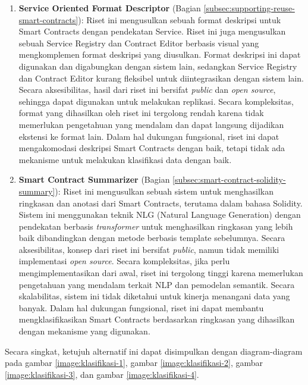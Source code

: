\begin{enumerate}
    \item \textbf{Service Oriented Format Descriptor} \parencite{guida2019supporting} (Bagian \ref{subsec:supporting-reuse-smart-contracts}): Riset ini mengusulkan sebuah format deskripsi untuk Smart Contracts dengan pendekatan Service. Riset ini juga mengusulkan sebuah Service Registry dan Contract Editor berbasis visual yang mengkomplemen format deskripsi yang diusulkan. Format deskripsi ini dapat digunakan dan digabungkan dengan sistem lain, sedangkan Service Registry dan Contract Editor kurang fleksibel untuk diintegrasikan dengan sistem lain. Secara aksesibilitas, hasil dari riset ini bersifat \textit{public} dan \textit{open source}, sehingga dapat digunakan untuk melakukan replikasi. Secara kompleksitas, format yang dihasilkan oleh riset ini tergolong rendah karena tidak memerlukan pengetahuan yang mendalam dan dapat langsung dijadikan ekstensi ke format lain. Dalam hal dukungan fungsional, riset ini dapat mengakomodasi deskripsi Smart Contracts dengan baik, tetapi tidak ada mekanisme untuk melakukan klasifikasi data dengan baik.
    
    \item \textbf{Smart Contract Summarizer} \parencite{zhang2021smart} (Bagian \ref{subsec:smart-contract-solidity-summary}): Riset ini mengusulkan sebuah sistem untuk menghasilkan ringkasan dan anotasi dari Smart Contracts, terutama dalam bahasa Solidity. Sistem ini menggunakan teknik NLG (Natural Language Generation) dengan pendekatan berbasis \textit{transformer} untuk menghasilkan ringkasan yang lebih baik dibandingkan dengan metode berbasis template sebelumnya. Secara aksesibilitas, konsep dari riset ini bersifat \textit{public}, namun tidak memiliki implementasi \textit{open source}. Secara kompleksitas, jika perlu mengimplementasikan dari awal, riset ini tergolong tinggi karena memerlukan pengetahuan yang mendalam terkait NLP dan pemodelan semantik. Secara skalabilitas, sistem ini tidak diketahui untuk kinerja menangani data yang banyak. Dalam hal dukungan fungsional, riset ini dapat membantu mengklasifikasikan Smart Contracts berdasarkan ringkasan yang dihasilkan dengan mekanisme yang digunakan.

\end{enumerate}

Secara singkat, ketujuh alternatif ini dapat disimpulkan dengan diagram-diagram pada gambar \ref{image:klasifikasi-1}, gambar \ref{image:klasifikasi-2}, gambar \ref{image:klasifikasi-3}, dan gambar \ref{image:klasifikasi-4}.
